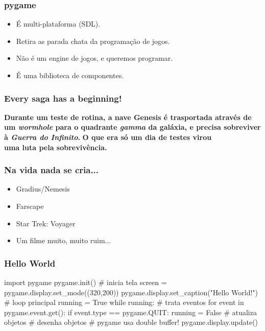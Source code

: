 
\begin{frame}
    \frametitle{pygame}

    \begin{itemize}
        \item É multi-plataforma (SDL).
        \item Retira as parada chata da programação de jogos.
        \item Não é um engine de jogos, e queremos programar.
        \item É uma biblioteca de componentes.
    \end{itemize}
\end{frame}


\begin{frame}
    \frametitle{Every saga has a beginning!}
    \vfill
    \begin{center}
    \large \textbf{Durante um teste de rotina, a nave Genesis é trasportada
    através de um \textit{wormhole} para o quadrante \textit{gamma} da galáxia,
    e precisa sobreviver à \textit{Guerra do Infinito}.}
    \vfill
    \large\textbf{O que era só um dia de testes virou\\uma luta pela sobrevivência.}
    \end{center}
    \vfill
\end{frame}

\begin{frame}
    \frametitle{Na vida nada se cria...}

    \begin{itemize}
        \item Gradius/Nemesis
        \item Farscape
        \item Star Trek: Voyager
        \item Um filme muito, muito ruim...
    \end{itemize}
\end{frame}


\begin{frame}[fragile]
    \frametitle{Hello World}

    \begin{python}
        import pygame
        pygame.init()
        # inicia tela
        screen = pygame.display.set_mode((320,200))
        pygame.display.set_caption("Hello World!")
        # loop principal
        running = True
        while running:
            # trata eventos
            for event in pygame.event.get():
                if event.type == pygame.QUIT:
                    running = False
            # atualiza objetos
            # desenha objetos
            # pygame usa double buffer!
            pygame.display.update()
    \end{python}
\end{frame}

